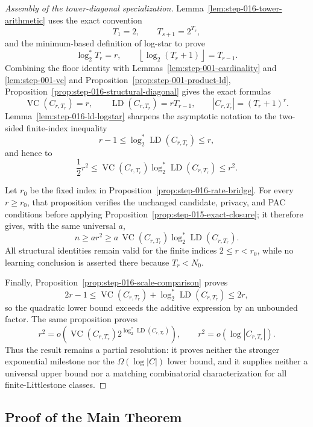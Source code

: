 \begin{proof}[Assembly of the tower-diagonal specialization]
Lemma~\ref{lem:step-016-tower-arithmetic} uses the exact convention
\[
T_1=2,\qquad T_{s+1}=2^{T_s},
\]
and the minimum-based definition of log-star to
prove
\[
\log_2^*T_r=r,
\qquad
\left\lfloor\log_2(T_r+1)\right\rfloor=T_{r-1}.
\]
Combining the floor identity with Lemmas~\ref{lem:step-001-cardinality} and
\ref{lem:step-001-vc} and
Proposition~\ref{prop:step-001-product-ld},
Proposition~\ref{prop:step-016-structural-diagonal} gives the exact formulas
\[
\operatorname{VC}(C_{r,T_r})=r,
\qquad
\operatorname{LD}(C_{r,T_r})=rT_{r-1},
\qquad
|C_{r,T_r}|=(T_r+1)^r.
\]
Lemma~\ref{lem:step-016-ld-logstar} sharpens the asymptotic notation to the
two-sided finite-index inequality
\[
r-1\le
\log_2^*\operatorname{LD}(C_{r,T_r})
\le r,
\]
and hence to
\[
\frac12r^2\le
\operatorname{VC}(C_{r,T_r})
\log_2^*\operatorname{LD}(C_{r,T_r})
\le r^2.
\]

Let $r_0$ be the fixed index in
Proposition~\ref{prop:step-016-rate-bridge}.  For every $r\ge r_0$, that
proposition verifies the unchanged candidate, privacy, and PAC conditions
before applying Proposition~\ref{prop:step-015-exact-closure}; it therefore
gives, with the same universal $a$,
\[
n\ge ar^2
\ge a\,\operatorname{VC}(C_{r,T_r})
       \log_2^*\operatorname{LD}(C_{r,T_r}).
\]
All structural identities remain valid for the finite indices
$2\le r<r_0$, while no learning conclusion is asserted there because
$T_r<N_0$.

Finally, Proposition~\ref{prop:step-016-scale-comparison} proves
\[
2r-1\le
\operatorname{VC}(C_{r,T_r})+
\log_2^*\operatorname{LD}(C_{r,T_r})
\le2r,
\]
so the quadratic lower bound exceeds the additive expression by an
unbounded factor.  The same proposition proves
\[
r^2=o\!\left(
\operatorname{VC}(C_{r,T_r})
2^{\log_2^*\operatorname{LD}(C_{r,T_r})}
\right),
\qquad
r^2=o(\log|C_{r,T_r}|).
\]
Thus the result remains a partial resolution: it proves neither the
stronger exponential milestone nor the $\Omega(\log|C|)$ lower bound,
and it supplies neither a universal upper bound nor a matching
combinatorial characterization for all finite-Littlestone classes.
\end{proof}

\subsection{Proof of the Main Theorem}\label{app:main-proof}

